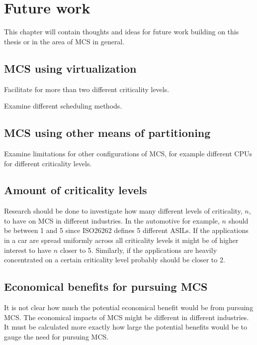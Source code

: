 \chapter{Future work}
This chapter will contain thoughts and ideas for future work building on this thesis or in the area of MCS in general.

\section{MCS using virtualization}
Facilitate for more than two different criticality levels.

Examine different scheduling methods. %

\section{MCS using other means of partitioning}
Examine limitations for other configurations of MCS, for example different CPUs for different criticality levels.

\section{Amount of criticality levels}
Research should be done to investigate how many different levels of criticality, $n$, to have on MCS in different industries. In the automotive for example, $n$ should be between 1 and 5 since ISO26262 defines 5 different ASILs. If the applications in a car are spread uniformly across all criticality levels it might be of higher interest to have $n$ closer to 5. Similarly, if the applications are heavily concentrated on a certain criticality level probably should be closer to 2.

\section{Economical benefits for pursuing MCS}
It is not clear how much the potential economical benefit would be from pursuing MCS. The economical impacts of MCS might be different in different industries. It must be calculated more exactly how large the potential benefits would be to gauge the need for pursuing MCS.